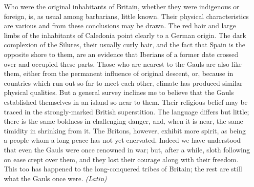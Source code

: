 Who were the original inhabitants of Britain, whether they were indigenous or foreign, is, as usual among barbarians, little known. Their physical characteristics are various and from these conclusions may be drawn. The red hair and large limbs of the inhabitants of Caledonia point clearly to a German origin. The dark complexion of the Silures, their usually curly hair, and the fact that Spain is the opposite shore to them, are an evidence that Iberians of a former date crossed over and occupied these parts. Those who are nearest to the Gauls are also like them, either from the permanent influence of original descent, or, because in countries which run out so far to meet each other, climate has produced similar physical qualities. But a general survey inclines me to believe that the Gauls established themselves in an island so near to them. Their religious belief may be traced in the strongly-marked British superstition. The language differs but little; there is the same boldness in challenging danger, and, when it is near, the same timidity in shrinking from it. The Britons, however, exhibit more spirit, as being a people whom a long peace has not yet enervated. Indeed we have understood that even the Gauls were once renowned in war; but, after a while, sloth following on ease crept over them, and they lost their courage along with their freedom. This too has happened to the long-conquered tribes of Britain; the rest are still what the Gauls once were. \emph{(Latin)}


